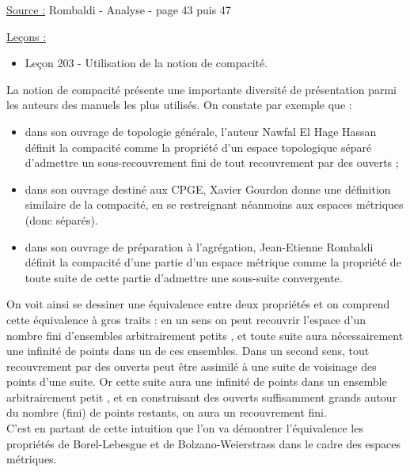 

\pagestyle{fancy}

\fancyhead[R]{}



\underline{Source :} Rombaldi - Analyse - page 43 puis 47

\underline{Leçons :}
\begin{itemize}
\item Leçon 203 - Utilisation de la notion de compacité.
\end{itemize}

\begin{intro}
La notion de compacité présente une importante diversité de présentation parmi les auteurs des manuels les plus utilisés.
On constate par exemple que :
\begin{itemize}
\item dans son ouvrage de topologie générale, l'auteur Nawfal El Hage Hassan définit la compacité comme la propriété d'un espace
topologique séparé d'admettre un sous-recouvrement fini de tout recouvrement par des ouverts ;
\item dans son ouvrage destiné aux CPGE, Xavier Gourdon donne une définition similaire de la compacité, en se restreignant néanmoins
aux espaces métriques (donc séparés).
\item dans son ouvrage de préparation à l’agrégation, Jean-Etienne Rombaldi définit la compacité d'une partie d'un espace métrique
comme la propriété de toute suite de cette partie d'admettre une sous-suite convergente.
\end{itemize}
On voit ainsi se dessiner une équivalence entre deux propriétés et on comprend cette équivalence à gros traits : 
en un sens on peut recouvrir l'espace d'un nombre fini d'ensembles arbitrairement \og petits \fg{}, et toute suite aura nécessairement 
une infinité de points dans un de ces ensembles. 
Dans un second sens, tout recouvrement par des ouverts peut être assimilé à une suite de voisinage des points d'une suite. 
Or cette suite aura une infinité de points dans un ensemble arbitrairement \og petit \fg{}, et en construisant des ouverts
suffisamment \og grands \fg{} autour du nombre (fini) de points restants, on aura un recouvrement fini. \\
C'est en partant de cette intuition que l'on va démontrer l'équivalence les propriétés de Borel-Lebesgue et de Bolzano-Weierstrass
dans le cadre des espaces métriques.
\end{intro}

